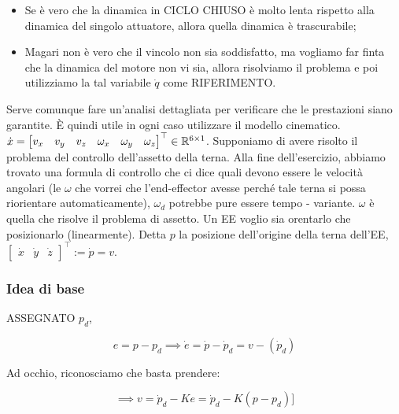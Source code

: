 \begin{itemize}

\item Se è vero che la dinamica in CICLO CHIUSO è molto lenta rispetto alla dinamica del singolo attuatore, allora quella dinamica è trascurabile;
\item Magari non è vero che il vincolo non sia soddisfatto, ma vogliamo far finta che la dinamica del motore non vi sia, allora risolviamo il problema e poi utilizziamo la tal variabile $\dot{q}$ come RIFERIMENTO.

\end{itemize}

Serve comunque fare un'analisi dettagliata per verificare che le prestazioni siano garantite. \`E quindi utile in ogni caso utilizzare il modello cinematico. $\dot{x}=\begin{bmatrix}v_x&v_y&v_z&\omega_x&\omega_y&\omega_z\end{bmatrix}^\top\in\mathbb{R}^{6\times 1}$. Supponiamo di avere risolto il problema del controllo dell'assetto della terna. Alla fine dell'esercizio, abbiamo trovato una formula di controllo che ci dice quali devono essere le velocità angolari (le $\omega$ che vorrei che l'end-effector avesse perché tale terna si possa riorientare automaticamente), $\omega_d$ potrebbe pure essere tempo - variante. $\omega$ è quella che risolve il problema di assetto. Un EE voglio sia orentarlo che posizionarlo (linearmente). Detta $p$ la posizione dell'origine della terna dell'EE, $\begin{bmatrix}\dot{x}&\dot{y}&\dot{z}\end{bmatrix}^\top := \dot{p} = v$.

\subsubsection{Idea di base}

ASSEGNATO $p_d$, 

\[
	e = p-p_d\implies \dot{e}=\dot{p}-\dot{p}_d = v - (\dot{p}_d)
\]

Ad occhio, riconosciamo che basta prendere:

\[
	\implies v = \dot{p}_d - Ke = \dot{p}_d - K(p-p_d)]
\]

